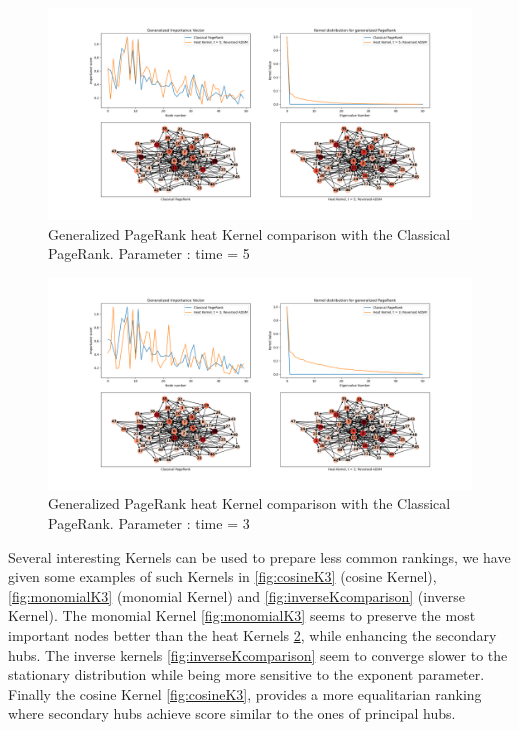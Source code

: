 \documentclass{article}
\begin{document}
\begin{figure}[h!]
    \centering
    \centerline{
    \includegraphics[width= 1.55\textwidth]{results_figures/heat_kernel_5.png}
    }
    \caption{Generalized PageRank heat Kernel comparison with the Classical PageRank. Parameter : time = 5}
    \label{fig:heatK5}
\end{figure}


\begin{figure}[h!]
    \centering
    \centerline{
    \includegraphics[width= 1.55\textwidth]{results_figures/heat_kernel_3.png}
    }
    \caption{Generalized PageRank heat Kernel comparison with the Classical PageRank. Parameter : time = 3}
    \label{fig:heatK3}
\end{figure}

Several interesting Kernels can be used to prepare less common rankings, we have given some examples of such Kernels in \ref{fig:cosineK3} (cosine Kernel), \ref{fig:monomialK3} (monomial Kernel) and \ref{fig:inverseKcomparison} (inverse Kernel). The monomial Kernel \ref{fig:monomialK3} seems to preserve the most important nodes better than the heat Kernels \ref{fig:heatK3}, while enhancing the secondary hubs. The inverse kernels \ref{fig:inverseKcomparison} seem to converge slower to the stationary distribution while being more sensitive to the exponent parameter. Finally the cosine Kernel \ref{fig:cosineK3}, provides a more equalitarian ranking where secondary hubs achieve score similar to the ones of principal hubs.
\end{document}
